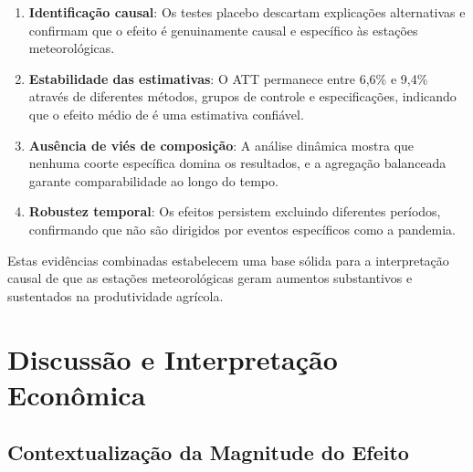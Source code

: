 \documentclass[
	12pt,				%
	oneside,			%
	a4paper,			%
	english,			%
	french,				%
	spanish,			%
	brazil				%
	]{abntex2}
\begin{document}
\begin{enumerate}
\item \textbf{Identificação causal}: Os testes placebo descartam explicações alternativas e confirmam que o efeito é genuinamente causal e específico às estações meteorológicas.

\item \textbf{Estabilidade das estimativas}: O ATT permanece entre 6,6\% e 9,4\% através de diferentes métodos, grupos de controle e especificações, indicando que o efeito médio de \mainattpct{} é uma estimativa confiável.

\item \textbf{Ausência de viés de composição}: A análise dinâmica mostra que nenhuma coorte específica domina os resultados, e a agregação balanceada garante comparabilidade ao longo do tempo.

\item \textbf{Robustez temporal}: Os efeitos persistem excluindo diferentes períodos, confirmando que não são dirigidos por eventos específicos como a pandemia.
\end{enumerate}

Estas evidências combinadas estabelecem uma base sólida para a interpretação causal de que as estações meteorológicas geram aumentos substantivos e sustentados na produtividade agrícola.

\section{Discussão e Interpretação Econômica}

\subsection{Contextualização da Magnitude do Efeito}
\end{document}
